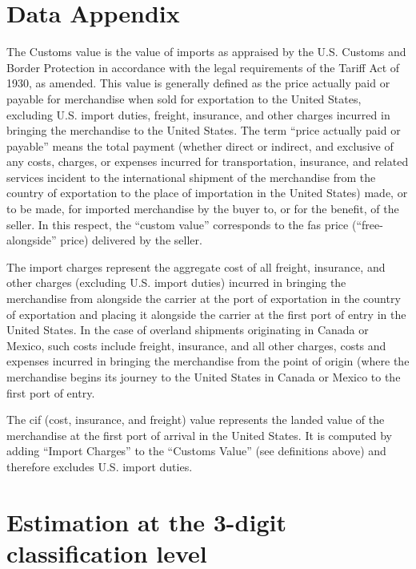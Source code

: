 \documentclass[a4paper,11pt]{article}
\begin{document}
\newpage


\appendix

\section{Data Appendix \label{app:data}}


The Customs value is the value of imports as appraised by the U.S. Customs and Border Protection in accordance with the legal requirements of the Tariff Act of 1930, as amended. This value is generally defined as the price actually paid or payable for merchandise when sold for exportation to the United States, excluding U.S. import duties, freight, insurance, and other charges incurred in bringing the merchandise to the United States. The term ``price actually paid or payable'' means the total payment (whether direct or indirect, and exclusive of any costs, charges, or expenses incurred for transportation, insurance, and related services incident to the international shipment of the merchandise from the country of exportation to the place of importation in the United States) made, or to be made, for imported merchandise by the buyer to, or for the benefit, of the seller. In this respect, the ``custom value'' corresponds to the fas price (``free-alongside'' price) delivered by the seller.

The import charges represent the aggregate cost of all freight, insurance, and other charges (excluding U.S. import duties) incurred in bringing the merchandise from alongside the carrier at the port of exportation in the country of exportation and placing it alongside the carrier at the first port of entry in the United States. In the case of overland shipments originating in Canada or Mexico, such costs include freight, insurance, and all other charges, costs and expenses incurred in bringing the merchandise from the point of origin (where the merchandise begins its journey to the United States in Canada or Mexico to the first port of entry.

The cif (cost, insurance, and freight) value represents the landed value of the merchandise at the first port of arrival in the United States. It is computed by adding ``Import Charges'' to the ``Customs Value'' (see definitions above) and therefore excludes U.S. import duties.

\section{Estimation at the 3-digit classification level \label{app:more_results}}
\end{document}
